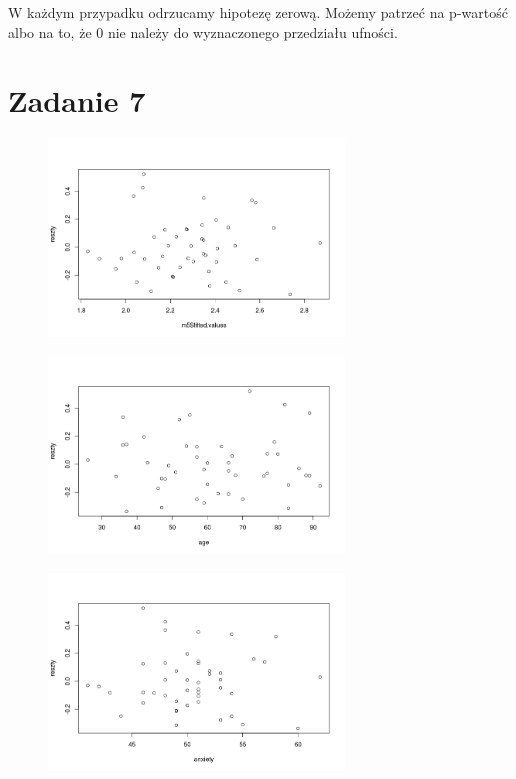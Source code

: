 \documentclass[9pt]{article}  %
\begin{document}
  W każdym przypadku odrzucamy hipotezę zerową. Możemy patrzeć na p-wartość albo na to, że 0 nie należy do wyznaczonego przedziału ufności.




\section{Zadanie 7}

    \begin{figure}[H]
      \centering
      \includegraphics[width=0.7\textwidth]{71.png}
      \caption {}
    \end{figure} 
    \begin{figure}[H]
      \centering
      \includegraphics[width=0.7\textwidth]{72.png}
      \caption {}
    \end{figure} 
    \begin{figure}[H]
      \centering
      \includegraphics[width=0.7\textwidth]{73.png}
      \caption {}
    \end{figure} 
\end{document}

